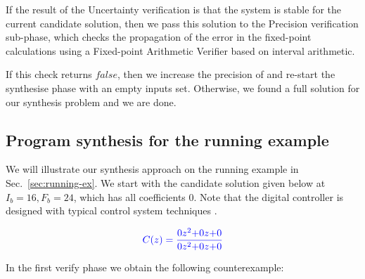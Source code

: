 \documentclass{sig-alternate-05-2015}
\newcommand{\blue}[1]{{\color{blue}#1}}
\newcommand{\red}[1]{{\color{red}#1}}
\begin{document}
If the result of the {\sc Uncertainty} verification is that
the system is stable for the current candidate solution,
then we pass this solution to the {\sc Precision} verification sub-phase, 
which checks the propagation of the error in the fixed-point 
calculations using a Fixed-point Arithmetic Verifier based on 
interval arithmetic. 
%
%

If this check returns $false$, then we 
increase the precision of  and re-start the {\sc synthesise} phase
with an empty {\sc inputs} set.
Otherwise, we found a full solution for our synthesis problem
and we are done.

\subsection{Program synthesis for the running example}
We will illustrate our synthesis approach on the running example 
in Sec.~\ref{sec:running-ex}.
We start with the candidate solution given below at $I_b=16,F_b=24$,
which has all coefficients 0.
Note that the digital controller is designed with typical control system
techniques \cite{Kuo:2002:ACS:579453,Ogata:1987:DCS:26170}.

$$
\blue{
C(z)=\frac{0z^2{+}0z{+}0}{0z^2{+}0z{+}0}
}
$$

In the first {\sc verify} phase we obtain the following counterexample:
\end{document}
